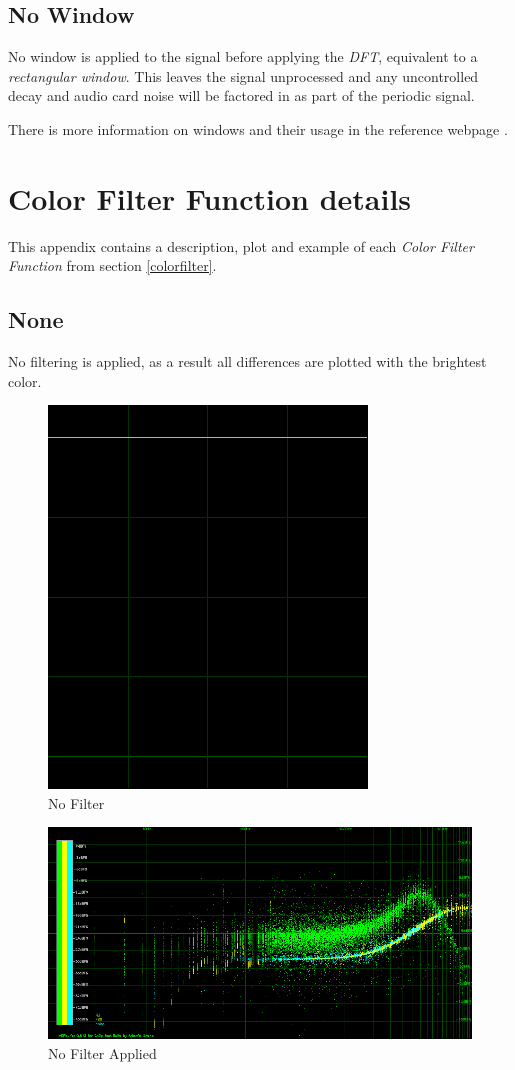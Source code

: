 \documentclass[10pt,a4paper]{report}
\begin{document}
\begin{appendices}
\section{No Window}

No window is applied to the signal before applying the \textit{DFT}, equivalent to a \textit{rectangular window}. This leaves the signal unprocessed and any uncontrolled decay and audio card noise will be factored in as part of the periodic signal.

There is more information on windows and their usage in the reference webpage \cite{windowtypes}.

\chapter{Color Filter Function details}
\label{filterfunctions}

This appendix contains a description, plot and example of each \textit{Color Filter Function} from section \ref{colorfilter}.

\newpage
\section{None} 

No filtering is applied, as a result all differences are plotted with the brightest color. 

\begin{figure}[H]
	\centering
	\includegraphics[width=0.4\linewidth]{plots/BetaFunctionPlot_0.png}
	\caption[No Filter]{No Filter}
	\label{fig:betafunctionplot0}
\end{figure}

\begin{figure}[H]
	\centering
	\includegraphics[width=1\linewidth]{plots/BetaFunctionPlot_0_Data.png}
	\caption[No Filter]{No Filter Applied}
	\label{fig:betafunctionplot0data}
\end{figure}


\end{appendices}
\end{document}
